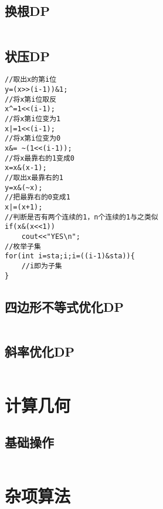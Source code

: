 \documentclass[twocolumn,a4]{article}
\begin{document}
\subsection{换根DP}
\begin{lstlisting}

\end{lstlisting}

\subsection{状压DP}
\begin{lstlisting}
//取出x的第i位
y=(x>>(i-1))&1;
//将x第i位取反
x^=1<<(i-1);
//将x第i位变为1
x|=1<<(i-1);
//将x第i位变为0
x&= ~(1<<(i-1));
//将x最靠右的1变成0
x=x&(x-1);
//取出x最靠右的1
y=x&(~x);
//把最靠右的0变成1
x|=(x+1);
//判断是否有两个连续的1，n个连续的1与之类似
if(x&(x<<1))
    cout<<"YES\n";
//枚举子集
for(int i=sta;i;i=((i-1)&sta)){
    //i即为子集
}
\end{lstlisting}

\subsection{四边形不等式优化DP}
\begin{lstlisting}

\end{lstlisting}

\subsection{斜率优化DP}
\begin{lstlisting}

\end{lstlisting}

\section{计算几何}

\subsection{基础操作}
\begin{lstlisting}

\end{lstlisting}

\section{杂项算法}
\end{document}
